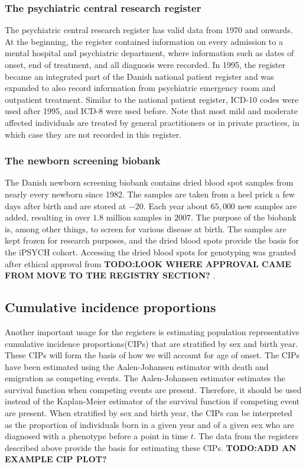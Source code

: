 \subsubsection{The psychiatric central research register}
The psychiatric central research register has valid data from 1970 and onwards. At the beginning, the register contained information on every admission to a mental hospital and psychiatric department, where information such as dates of onset, end of treatment, and all diagnosis were recorded. In 1995, the register became an integrated part of the Danish national patient register and was expanded to also record information from psychiatric emergency room and outpatient treatment. Similar to the national patient register, ICD-10 codes were used after 1995, and ICD-8 were used before. Note that most mild and moderate affected individuals are treated by general practitioners or in private practices, in which case they are not recorded in this register.\cite{mors2011danish}


\subsubsection{The newborn screening biobank}
The Danish newborn screening biobank contains dried blood spot samples from nearly every newborn since 1982. The samples are taken from a heel prick a few days after birth and are stored at $ -20 $\textcelsius. Each year about $ 65,000 $ new samples are added, resulting in over $ 1.8 $ million samples in $ 2007 $. The purpose of the biobank is, among other things, to screen for various disease at birth. The samples are kept frozen for research purposes, and the dried blood spots provide the basis for the iPSYCH cohort. Accessing the dried blood spots for genotyping was granted after ethical approval from \textbf{TODO:LOOK WHERE APPROVAL CAME FROM} \textbf{MOVE TO THE REGISTRY SECTION?}  \cite{norgaard2007storage}.

\subsection{Cumulative incidence proportions}
Another important usage for the registers is estimating population representative cumulative incidence proportions(CIPs) that are stratified by sex and birth year. These CIPs will form the basis of how we will account for age of onset. The CIPs have been estimated using the Aalen-Johansen estimator\cite{hansen2017estimating} with death and emigration as competing events. The Aalen-Johansen estimator estimates the survival function when competing events are present. Therefore, it should be used instead of the Kaplan-Meier estimator of the survival function if competing event are present. When stratified by sex and birth year, the CIPs can be interpreted as the proportion of individuals born in a given year and of a given sex who are diagnosed with a phenotype before a point in time $ t $. The data from the registers described above provide the basis for estimating these CIPs.
\textbf{TODO:ADD AN EXAMPLE CIP PLOT?}



